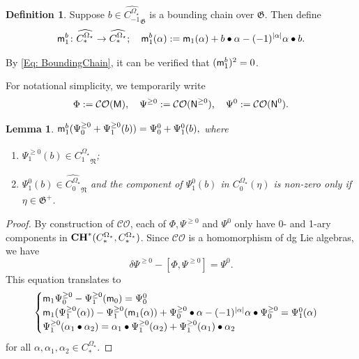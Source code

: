 \documentclass[10pt]{amsart}
\numberwithin{equation}{section}
\theoremstyle{plain}
\newtheorem{lemma}[theorem]{Lemma}
\theoremstyle{definition}
\newtheorem{definition}[theorem]{Definition}
\theoremstyle{remark}
\numberwithin{equation}{section}
\newcommand{\wh}[1]{\widehat{#1}}
\newcommand{\mf}[1]{\mathfrak{#1}}
\newcommand{\CO}{\mathcal{CO}}
\newcommand{\CC}{\textbf{\textup{CH}}}
\newcommand{\CBa}{C_*^{\Omega_\star}}
\newcommand{\Cba}[1]{C_{#1}^{\Omega_\star}}
\newcommand{\MM}{\textup{\textsf{M}}}
\newcommand{\mm}{\textup{\textsf{m}}}
\newcommand{\NN}{\textup{\textsf{N}}}
\begin{document}
{\begin{definition}\label{Defn: m1BoundingChainDeformed}
	Suppose $b\in \wh{\Cba{-1}}_\mf{G}$ is a bounding chain over $\mf{G}$. 
	Then define \begin{align*}
		\mm_1^b\colon \wh{\CBa}\to \wh{\CBa}; \quad \mm_1^b(\alpha):= \mm_1(\alpha) +b\bullet \alpha - (-1)^{|\alpha|} \alpha \bullet b.
	\end{align*}
\end{definition}
By \eqref{Eq: BoundingChain}, it can be verified that $(\mm_1^b)^2=0$.



For notational simplicity, we temporarily write  
\begin{align*}
	\Phi:= \CO(\MM), \quad \Psi^{\geq 0} := \CO(\NN^{\geq 0}),\quad \Psi^{0}:= \CO(\NN^{0}).
\end{align*}



\begin{lemma}\label{Lm: ThmPfIdKilled}
	$\mm_1^b(\Psi_0^{\geq 0} + \Psi_1^{\geq 0}(b)) = \Psi_0^{0} + \Psi_1^{0}(b),$ where
	\begin{enumerate}
		\item $\Psi_1^{\geq 0}(b)\in \wh{\Cba{1}}_\mf{N}$;
		\item $\Psi_1^{0}(b) \in \wh{\Cba{0}}_\mf{N}$ and the component of $\Psi_1^{0}(b)$ in $\Cba{0}(\eta)$ is non-zero only if $\eta\in \mf{G}^+$.
	\end{enumerate}
\end{lemma}
\begin{proof}
By construction of $\CO$, each of $\Phi, \Psi^{\geq 0}$ and $\Psi^{0}$ only have 0- and 1-ary components in $\CC^*(\CBa,\CBa)$.
Since $\CO$ is a homomorphism of dg Lie algebras, we have \[ \delta \Psi^{\geq 0} - \left[\Phi, \Psi^{\geq 0}\right] = \Psi^{ 0}. \]
This equation translates to 
\begin{align}\label{Eq: BoundChainDisp}
	\begin{cases}
		\mm_1\Psi_0^{\geq 0} - \Psi_1^{\geq 0}(\mm_0) = \Psi_0^{0}\\
		\mm_1(\Psi_1^{\geq 0}(\alpha)) - \Psi_1^{\geq 0}(\mm_1(\alpha)) + \Psi_0^{\geq 0} \bullet \alpha - (-1)^{|\alpha|} \alpha\bullet \Psi_0^{\geq 0} = \Psi_1^{0}(\alpha)\\
		\Psi_1^{\geq 0}(\alpha_1\bullet\alpha_2) = \alpha_1\bullet\Psi_1^{\geq 0}(\alpha_2) + \Psi_1^{\geq 0}(\alpha_1)\bullet \alpha_2
	\end{cases}
\end{align}
for all $\alpha,\alpha_1,\alpha_2\in \CBa$.


\end{proof}}
\end{document}
